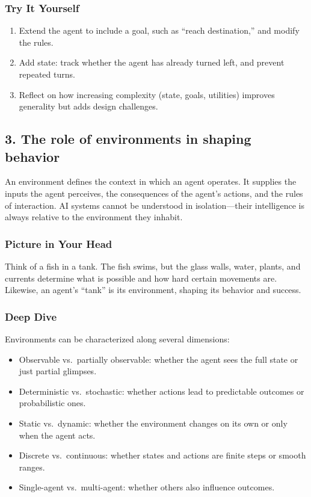 \documentclass[
  letterpaper,
  DIV=11,
  numbers=noendperiod]{scrreprt}
\providecommand{\tightlist}{%
  \setlength{\itemsep}{0pt}\setlength{\parskip}{0pt}}
\begin{document}
\subsubsection{Try It Yourself}\label{try-it-yourself-1}

\begin{enumerate}
\def\labelenumi{\arabic{enumi}.}
\tightlist
\item
  Extend the agent to include a goal, such as ``reach destination,'' and
  modify the rules.
\item
  Add state: track whether the agent has already turned left, and
  prevent repeated turns.
\item
  Reflect on how increasing complexity (state, goals, utilities)
  improves generality but adds design challenges.
\end{enumerate}

\subsection{3. The role of environments in shaping
behavior}\label{the-role-of-environments-in-shaping-behavior}

An environment defines the context in which an agent operates. It
supplies the inputs the agent perceives, the consequences of the agent's
actions, and the rules of interaction. AI systems cannot be understood
in isolation---their intelligence is always relative to the environment
they inhabit.

\subsubsection{Picture in Your Head}\label{picture-in-your-head-2}

Think of a fish in a tank. The fish swims, but the glass walls, water,
plants, and currents determine what is possible and how hard certain
movements are. Likewise, an agent's ``tank'' is its environment, shaping
its behavior and success.

\subsubsection{Deep Dive}\label{deep-dive-2}

Environments can be characterized along several dimensions:

\begin{itemize}
\tightlist
\item
  Observable vs.~partially observable: whether the agent sees the full
  state or just partial glimpses.
\item
  Deterministic vs.~stochastic: whether actions lead to predictable
  outcomes or probabilistic ones.
\item
  Static vs.~dynamic: whether the environment changes on its own or only
  when the agent acts.
\item
  Discrete vs.~continuous: whether states and actions are finite steps
  or smooth ranges.
\item
  Single-agent vs.~multi-agent: whether others also influence outcomes.
\end{itemize}
\end{document}
